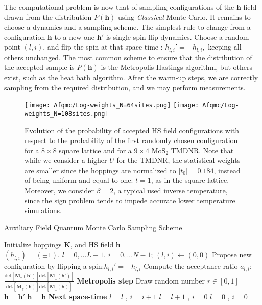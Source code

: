 The computational problem is now that of sampling configurations of the $\bm h$ field drawn from the distribution $P(\bm h)$ using \emph{Classical} Monte Carlo.
It remains to choose a dynamics and a sampling scheme. The simplest rule to change from a configuration $\bm h$ to a new one $\bm h'$ is single spin-flip dynamics. 
Choose a random point $(l, i)$, and flip the spin at that space-time  :
$
h_{l, i}' = - h_{l, i},
$
keeping all others unchanged.
The most common scheme to ensure that the distribution of the accepted sample is $P(\bm h)$ is the Metropolis-Hastings algorithm, but others exist, such as the heat bath algorithm.
After the warm-up steps, we are correctly sampling from the required distribution, and we may perform measurements.
\begin{figure}[H]\label{fig:convergence}
\texttt{[image: Afqmc/Log-weights\_N=64sites.png]}
\hspace{-0.8cm}
\texttt{[image: Afqmc/Log-weights\_N=108sites.png]}
\caption[Evolution of the probability of accepted configurations.]{Evolution of the probability of accepted HS field  configurations with respect to the probability of the first randomly chosen configuration for a $8 \times 8$ square lattice and for a $9 \times 4$ $\text{Mo}\text{S}_2$ \acs{TMDNR}. Note that while we consider a higher $U$  for the \acs{TMDNR}, the statistical weights are smaller since the hoppings are normalized to $|t_0| = 0.184$, instead of being uniform and equal to one: $t= 1$, as in the square lattice. Moreover, we consider $\beta = 2$, a typical used inverse temperature, since the sign problem tends to impede accurate lower temperature simulations.}
\end{figure}
\begin{algorithm}
\caption{Auxiliary Field Quantum Monte Carlo Sampling Scheme}
\label{afqmcSampling}
\begin{algorithmic}[5]
  \STATE Initialize hoppings $\bm K$, and  HS field $\bm h$  \\
  \STATE  $(h_{l, i}) = (\pm 1)$, $ l=0,... L-1$, $i = 0, ... N-1$; $(l, i) \leftarrow (0, 0)$
  \STATE \footnotesize{Propose new configuration by flipping a spin:}\normalsize{$h_{l, i}' = - h_{l, i}$} 
  \STATE \footnotesize{Compute the acceptance ratio $a_{l, i}$}:
  \normalsize{$\frac{\text{det}[\bm M_\uparrow (\bm h')]\text{det}[\bm M_\downarrow (\bm h')]}{\text{det}[\bm M_\uparrow (\bm h)]\text{det}[\bm M_\downarrow (\bm h)]}$}
  \STATE \textbf{\normalsize{Metropolis step}}
  \STATE \footnotesize{Draw random number $r \in [0,1]$}
  \STATE $\bm h = \bm h'$
  \ELSE
  \STATE $\bm h = \bm h$
  \ENDIF
  \STATE \textbf{Next space-time }
  \STATE $l = l$ , $i = i +1 $
  \ELSE
  \STATE $l = l+1$ , $i = 0 $
  \ENDIF
  \STATE $l = 0$ , $i=0$
  \ENDIF
  \ENDIF
  \ENDFOR
\end{algorithmic}
\end{algorithm}

